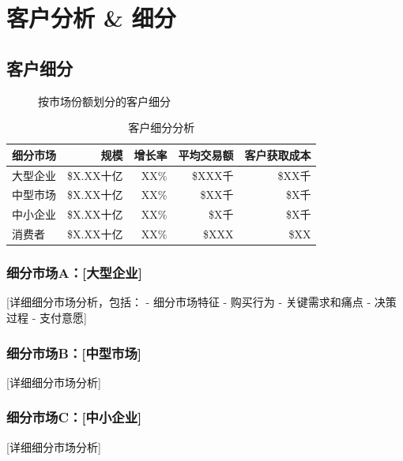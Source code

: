 \documentclass[11pt,letterpaper]{report}
\begin{document}
{\chapter{客户分析 \& 细分}

\section{客户细分}


\begin{figure}[htbp]
\centering
\caption{按市场份额划分的客户细分}
\label{fig:customer_segments}
\end{figure}

\begin{table}[htbp]
\centering
\caption{客户细分分析}
\begin{tabular}{@{}lrrrr@{}}
\toprule
\textbf{细分市场} & \textbf{规模} & \textbf{增长率} & \textbf{平均交易额} & \textbf{客户获取成本} \\
\midrule
大型企业 & \$X.XX十亿 & XX\% & \$XXX千 & \$XX千 \\
\rowcolor{tablealt} 中型市场 & \$X.XX十亿 & XX\% & \$XX千 & \$X千 \\
中小企业 & \$X.XX十亿 & XX\% & \$X千 & \$X千 \\
\rowcolor{tablealt} 消费者 & \$X.XX十亿 & XX\% & \$XXX & \$XX \\
\bottomrule
\end{tabular}
\label{tab:customer_segments}
\end{table}

\subsection{细分市场A：[大型企业]}
[详细细分市场分析，包括：
- 细分市场特征
- 购买行为
- 关键需求和痛点
- 决策过程
- 支付意愿]

\subsection{细分市场B：[中型市场]}
[详细细分市场分析]

\subsection{细分市场C：[中小企业]}
[详细细分市场分析]

}
\end{document}
